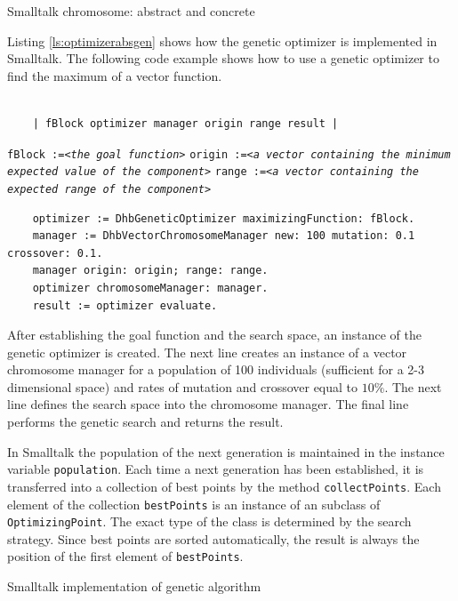\documentclass[twoside]{book}
\begin{document}
\begin{listing} Smalltalk chromosome: abstract and concrete \label{ls:chromosome}


\end{listing}
Listing \ref{ls:optimizerabsgen} shows how the genetic optimizer
is implemented in Smalltalk. The following code example shows how
to use a genetic optimizer to find the maximum of a vector
function.
\begin{codeExample}
\begin{verbatim}

    | fBlock optimizer manager origin range result |
\end{verbatim}
 {\tt fBlock :=<\sl the goal function\tt >}\hfil\break
 {\tt origin :=<\sl a vector containing the minimum expected value of the component\tt >}\hfil\break
 {\tt range :=<\sl a vector containing the expected range of the component\tt >}\hfil\break
\begin{verbatim}
    optimizer := DhbGeneticOptimizer maximizingFunction: fBlock.
    manager := DhbVectorChromosomeManager new: 100 mutation: 0.1 crossover: 0.1.
    manager origin: origin; range: range.
    optimizer chromosomeManager: manager.
    result := optimizer evaluate.
\end{verbatim}
\end{codeExample}
After establishing the goal function and the search space, an
instance of the genetic optimizer is created. The next line
creates an instance of a vector chromosome manager for a
population of 100 individuals (sufficient for a 2-3 dimensional
space) and rates of mutation and crossover equal to $10\%$. The
next line defines the search space into the chromosome manager.
The final line performs the genetic search and returns the result.

In Smalltalk the population of the next generation is maintained
in the instance variable {\tt population}. Each time a next
generation has been established, it is transferred into a
collection of best points by the method {\tt collectPoints}. Each
element of the collection {\tt bestPoints} is an instance of an
subclass of {\tt OptimizingPoint}. The exact type of the class is
determined by the search strategy. Since best points are sorted
automatically, the result is always the position of the first
element of  {\tt bestPoints}.

\begin{listing} Smalltalk implementation of genetic algorithm \label{ls:optimizerabsgen}

\end{listing}
\end{document}
